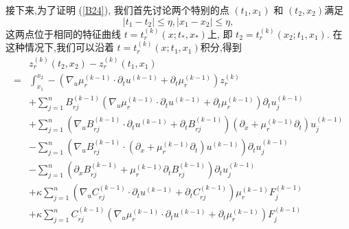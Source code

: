 \documentclass[notitlepage,cs4size,punct,oneside]{ctexrep}
\numberwithin{equation}{chapter}
\theoremstyle{mystyle}
\begin{document}
接下来,为了证明 (\ref{B24}), 我们首先讨论两个特别的点 $\left(t_{1}, x_{1}\right)$ 和 $\left(t_{2}, x_{2}\right)$满足
\begin{equation} \label{B70}
    \left|t_{1}-t_{2}\right| \leq \eta,\left|x_{1}-x_{2}\right| \leq \eta,
\end{equation}
这两点位于相同的特征曲线 $t=t_{r}^{(k)}\left(x ; t_{*}, x_{*}\right)$上, 即 $t_{2}=t_{r}^{(k)}\left(x_{2} ; t_{1}, x_{1}\right)$. 在这种情况下,我们可以沿着 $t=t_{r}^{(k)}\left(x ; t_{1}, x_{1}\right)$积分,得到
\begin{align}
      & z_{r}^{(k)}\left(t_{2}, x_{2}\right)-z_{r}^{(k)}\left(t_{1}, x_{1}\right)\nonumber                                                                                                                                                   \\
    = & \int_{x_{1}}^{x_{2}}-\left(\nabla_{u} \mu_{r}^{(k-1)} \cdot \partial_{t} u^{(k-1)} + \partial _{t} \mu _{r} ^{(k-1)}\right) z_{r}^{(k)}\nonumber                                                                                     \\
      & +\sum_{j=1}^{n} B_{r j}^{(k-1)}\left(\nabla_{u} \mu_{r}^{(k-1)} \cdot \partial_{t} u^{(k-1)} + \partial _{t} \mu _{r} ^{(k-1)}\right) \partial_{t} u_{j}^{(k-1)}\nonumber                                                            \\
      & +\sum_{j=1}^{n}\left(\nabla_{u} B_{r j}^{(k-1)} \cdot \partial_{t} u^{(k-1)} + \partial_{t} B_{rj}^{(k-1)}\right)\left(\partial_{x}+\mu_{r}^{(k-1)} \partial_{t} \right) u_{j}^{(k-1)} \nonumber                                     \\
      & -\sum_{j=1}^{n}\left(\nabla_{u} B_{r j}^{(k-1)} \cdot\left(\partial_{x}+\mu_{r}^{(k-1)} \partial_{t}\right) u^{(k-1)}\right) \partial_{t} u_{j}^{(k-1)}\nonumber                                                                     \\
      & -\sum_{j=1}^{n}\left(\partial_{x}B_{r j}^{(k-1)}+\mu_{r}^{(k-1)} \partial_{t}B_{r j}^{(k-1)} \right) \partial_{t} u_{j}^{(k-1)}\nonumber                                                                                             \\
      & +\kappa \sum_{j=1}^{n}\left(\nabla_{u} C_{r j}^{(k-1)} \cdot \partial_{t} u^{(k-1)} + \partial_{t} C_{r j}^{(k-1)}\right) \mu_{r}^{(k-1)} F_j^{(k-1)}\nonumber                                                                       \\
      & +\kappa \sum_{j=1}^{n} C_{r j}^{(k-1)}\left(\nabla_{u} \mu_{r}^{(k-1)} \cdot \partial_{t} u^{(k-1)} + \partial _{t} \mu _{r} ^{(k-1)}\right) F_j^{(k-1)} \nonumber                                                                   \\

\end{align}
\end{document}
